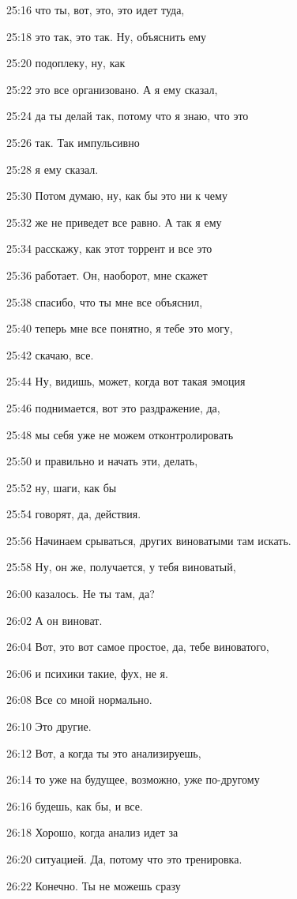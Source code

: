25:16
что ты, вот, это, это идет туда,

25:18
это так, это так. Ну, объяснить ему

25:20
подоплеку, ну, как

25:22
это все организовано. А я ему сказал,

25:24
да ты делай так, потому что я знаю, что это

25:26
так. Так импульсивно

25:28
я ему сказал.

25:30
Потом думаю, ну, как бы это ни к чему

25:32
же не приведет все равно. А так я ему

25:34
расскажу, как этот торрент и все это

25:36
работает. Он, наоборот, мне скажет

25:38
спасибо, что ты мне все объяснил,

25:40
теперь мне все понятно, я тебе это могу,

25:42
скачаю, все.

25:44
Ну, видишь, может, когда вот такая эмоция

25:46
поднимается, вот это раздражение, да,

25:48
мы себя уже не можем отконтролировать

25:50
и правильно и начать эти, делать,

25:52
ну, шаги, как бы

25:54
говорят, да, действия.

25:56
Начинаем срываться, других виноватыми там искать.

25:58
Ну, он же, получается, у тебя виноватый,

26:00
казалось. Не ты там, да?

26:02
А он виноват.

26:04
Вот, это вот самое простое, да, тебе виноватого,

26:06
и психики такие, фух, не я.

26:08
Все со мной нормально.

26:10
Это другие.

26:12
Вот, а когда ты это анализируешь,

26:14
то уже на будущее, возможно, уже по-другому

26:16
будешь, как бы, и все.

26:18
Хорошо, когда анализ идет за

26:20
ситуацией. Да, потому что это тренировка.

26:22
Конечно. Ты не можешь сразу

